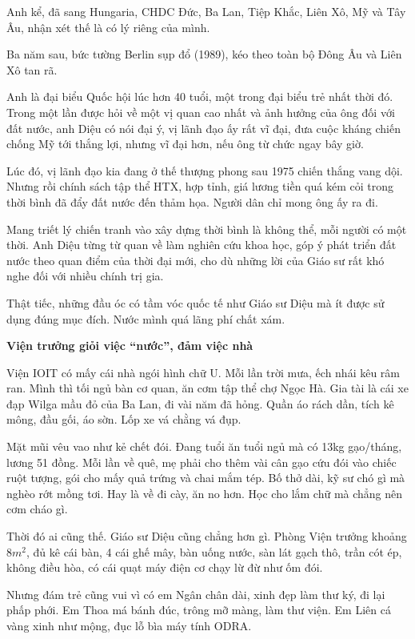 Anh kể, đã sang Hungaria, CHDC Đức, Ba Lan, Tiệp Khắc, Liên Xô, Mỹ và Tây Âu, nhận xét thế là có lý riêng của mình.

Ba năm sau, bức tường Berlin sụp đổ (1989), kéo theo toàn bộ Đông Âu và Liên Xô tan rã.

Anh là đại biểu Quốc hội lúc hơn 40 tuổi, một trong đại biểu trẻ nhất thời đó. Trong một lần được hỏi về một vị quan cao nhất và ảnh hưởng của ông đối với đất nước, anh Diệu có nói đại ý, vị lãnh đạo ấy rất vĩ đại, đưa cuộc kháng chiến chống Mỹ tới thắng lợi, nhưng vĩ đại hơn, nếu ông từ chức ngay bây giờ.

Lúc đó, vị lãnh đạo kia đang ở thế thượng phong sau 1975 chiến thắng vang dội. Nhưng rồi chính sách tập thể HTX, hợp tỉnh, giá lương tiền quá kém cỏi trong thời bình đã đẩy đất nước đến thảm họa. Người dân chỉ mong ông ấy ra đi.

Mang triết lý chiến tranh vào xây dựng thời bình là không thể, mỗi người có một thời. Anh Diệu từng từ quan về làm nghiên cứu khoa học, góp ý phát triển đất nước theo quan điểm của thời đại mới, cho dù những lời của Giáo sư rất khó nghe đối với nhiều chính trị gia.

Thật tiếc, những đầu óc có tầm vóc quốc tế như Giáo sư Diệu mà ít được sử dụng đúng mục đích. Nước mình quá lãng phí chất xám.

\begin{center}
\textbf{Viện trưởng giỏi việc “nước”, đảm việc nhà}
\end{center}

Viện IOIT có mấy cái nhà ngói hình chữ U. Mỗi lần trời mưa, ếch nhái kêu râm ran. Mình thì tối ngủ bàn cơ quan, ăn cơm tập thể chợ  Ngọc Hà. Gia tài là cái xe đạp Wilga mầu đỏ của Ba Lan, đi vài năm đã hỏng. Quần áo rách dần, tích kê mông, đầu gối, áo sờn. Lốp xe vá chằng vá đụp.

Mặt mũi vêu vao như kẻ chết đói. Đang tuổi ăn tuổi ngủ mà có 13kg gạo/tháng, lương 51 đồng. Mỗi lần về quê, mẹ phải cho thêm vài cân gạo cứu đói vào chiếc ruột tượng, gói cho mấy quả trứng và chai mắm tép. Bố thở dài, kỹ sư chó gì mà nghèo rớt mồng tơi. Hay là về đi cày, ăn no hơn. Học cho lắm chữ mà chẳng nên cơm cháo gì.

Thời đó ai cũng thế. Giáo sư Diệu cũng chẳng hơn gì. Phòng Viện trưởng khoảng $8m^2$, đủ kê cái bàn, 4 cái ghế mây, bàn uống nước, sàn lát gạch thô, trần cót ép, không điều hòa, có cái quạt máy điện cơ chạy lừ đừ như ốm đói.

Nhưng đám trẻ cũng vui vì có em Ngân chân dài, xinh đẹp làm thư ký, đi lại phấp phới. Em Thoa má bánh đúc, trông mỡ màng, làm thư viện. Em Liên cá vàng xinh như mộng, đục lỗ bìa máy tính ODRA.

